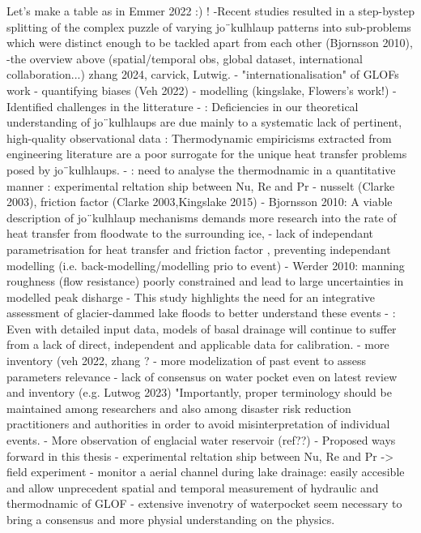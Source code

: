 Let's make a table as in Emmer 2022 :) ! 
      -Recent studies resulted in a step-bystep splitting of the complex puzzle of varying jo¨kulhlaup patterns into sub-problems which were distinct enough to be tackled apart from each other (Bjornsson 2010),
    -the overview above (spatial/temporal obs, global dataset, international collaboration...) zhang 2024, carvick, Lutwig.
    - "internationalisation" of GLOFs work
    - quantifying biases (Veh 2022)
    - modelling (kingslake, Flowers's work!)
- Identified challenges in the litterature
    - \cite{Roberts2005}: Deficiencies in our theoretical understanding of
jo¨kulhlaups are due mainly to a systematic lack of pertinent,
high-quality observational data
\cite{Roberts2005}: Thermodynamic empiricisms extracted from engineering
literature are a poor surrogate for the unique heat transfer
problems posed by jo¨kulhlaups.
    - \cite{Roberts2005}: need to analyse the thermodnamic in a quantitative manner : experimental reltation ship between Nu, Re and Pr
    - nusselt (Clarke 2003), friction factor (Clarke 2003,Kingslake 2015)
    - Bjornsson 2010: A viable description of jo¨kulhlaup mechanisms demands more research into the rate of heat transfer from floodwate to the surrounding ice,
    - lack of independant parametrisation for heat transfer \cite{Vincent&al2010} and friction factor \cite{Werder&al2010}, preventing independant modelling (i.e. back-modelling/modelling prio to event)
    - Werder 2010: manning roughness (flow resistance) poorly constrained and lead to large uncertainties in modelled peak disharge
    -  This study highlights the need for an integrative assessment of glacier-dammed lake floods to better understand these events \citep{Huss&al2007}
    - \cite{Flowers2015}: Even with detailed input data, models of basal drainage will continue to suffer from a lack of direct, independent and applicable data for calibration.
    - more inventory (veh 2022, zhang ? 
    - more modelization of past event to assess parameters relevance
    - lack of consensus on water pocket even on latest review and inventory (e.g. Lutwog 2023)
    \cite{Emmer&al2022} "Importantly, proper terminology should be maintained among researchers and also among disaster risk reduction practitioners and authorities in order to avoid misinterpretation of individual events.
    - More observation of englacial water reservoir (ref??)
- Proposed ways forward in this thesis
    - experimental reltation ship between Nu, Re and Pr -> field experiment
    - monitor a aerial channel during lake drainage: easily accesible and allow unprecedent spatial and temporal measurement of hydraulic and thermodnamic of GLOF
     - extensive invenotry of waterpocket seem necessary to bring a consensus and more physial understanding on the physics.



